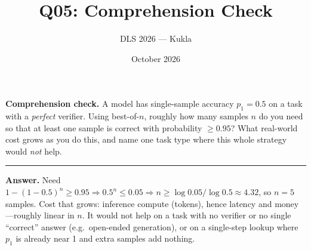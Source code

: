 \documentclass[11pt]{article}
\title{Q05: Comprehension Check}
\author{DLS 2026 --- Kukla}
\date{October 2026}
\begin{document}
\maketitle
\textbf{Comprehension check.} A model has single-sample accuracy $p_1=0.5$ on a task with a
\emph{perfect} verifier. Using best-of-$n$, roughly how many samples $n$ do you need so that at least
one sample is correct with probability $\ge 0.95$? What real-world cost grows as you do this, and name
one task type where this whole strategy would \emph{not} help.

\vspace{0.8cm}\hrule\vspace{4pt}
{\small\textbf{Answer.} Need $1-(1-0.5)^n \ge 0.95 \Rightarrow 0.5^n \le 0.05 \Rightarrow
n \ge \log 0.05 / \log 0.5 \approx 4.32$, so $n=5$ samples. Cost that grows: inference compute
(tokens), hence latency and money---roughly linear in $n$. It would not help on a task with no verifier
or no single ``correct'' answer (e.g.\ open-ended generation), or on a single-step lookup where $p_1$
is already near 1 and extra samples add nothing.}
\end{document}
